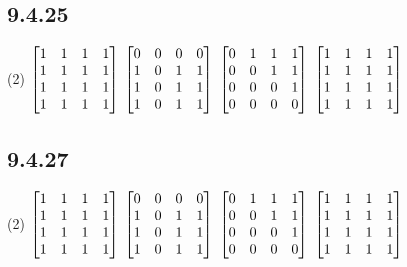 \documentclass[12pt,titlepage]{extarticle}
\begin{document}
\subsection*{9.4.25}
\begin{tasks}(2)
    \task $\mqty[
        1 & 1 & 1 & 1 \\
        1 & 1 & 1 & 1 \\
        1 & 1 & 1 & 1 \\
        1 & 1 & 1 & 1 \\
    ]$
    \task $\mqty[
        0 & 0 & 0 & 0 \\
        1 & 0 & 1 & 1 \\
        1 & 0 & 1 & 1 \\
        1 & 0 & 1 & 1 \\
    ]$
    \task $\mqty[
        0 & 1 & 1 & 1 \\
        0 & 0 & 1 & 1 \\
        0 & 0 & 0 & 1 \\
        0 & 0 & 0 & 0 \\
    ]$
    \task $\mqty[
        1 & 1 & 1 & 1 \\
        1 & 1 & 1 & 1 \\
        1 & 1 & 1 & 1 \\
        1 & 1 & 1 & 1 \\
    ]$
\end{tasks}

\subsection*{9.4.27}
\begin{tasks}(2)
    \task $\mqty[
        1 & 1 & 1 & 1 \\
        1 & 1 & 1 & 1 \\
        1 & 1 & 1 & 1 \\
        1 & 1 & 1 & 1 \\
    ]$
    \task $\mqty[
        0 & 0 & 0 & 0 \\
        1 & 0 & 1 & 1 \\
        1 & 0 & 1 & 1 \\
        1 & 0 & 1 & 1 \\
    ]$
    \task $\mqty[
        0 & 1 & 1 & 1 \\
        0 & 0 & 1 & 1 \\
        0 & 0 & 0 & 1 \\
        0 & 0 & 0 & 0 \\
    ]$
    \task $\mqty[
        1 & 1 & 1 & 1 \\
        1 & 1 & 1 & 1 \\
        1 & 1 & 1 & 1 \\
        1 & 1 & 1 & 1 \\
    ]$
\end{tasks}
\end{document}
